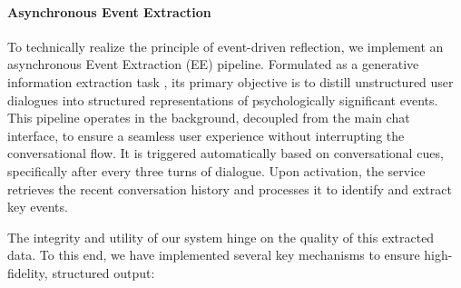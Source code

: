 \paragraph{Asynchronous Event Extraction}

To technically realize the principle of event-driven reflection, we implement an asynchronous Event Extraction (EE) pipeline. Formulated as a generative information extraction task \cite{xu2023large}, its primary objective is to distill unstructured user dialogues into structured representations of psychologically significant events. This pipeline operates in the background, decoupled from the main chat interface, to ensure a seamless user experience without interrupting the conversational flow. It is triggered automatically based on conversational cues, specifically after every three turns of dialogue. Upon activation, the service retrieves the recent conversation history and processes it to identify and extract key events.

The integrity and utility of our system hinge on the quality of this extracted data. To this end, we have implemented several key mechanisms to ensure high-fidelity, structured output:

